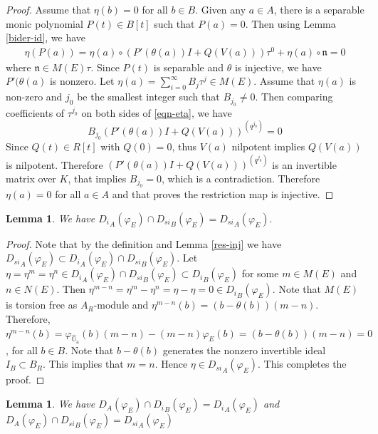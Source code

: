 \documentclass{amsart}
\newtheorem {lemma}[theorem] {\bf Lemma}
\numberwithin {equation}{section}
\def \hG{\hat{\mathbb{G}}_{\mathrm{a}}}
\begin{document}
\begin{proof} Assume that $\eta(b)=0$ for all $b\in B$. Given any $a\in A$, there is a separable monic polynomial $P(t)\in B[t]$ such that $P(a)=0$. Then using Lemma \ref{bider-id}, we have
\begin{align}\label{eqn-eta}
\eta(P(a))= \eta(a)\circ(P'(\theta (a))I+Q(V(a)))\tau^{0}+\eta(a)\circ\mathfrak{n}=0
\end{align}
where $\mathfrak{n}\in M(E)\tau$. Since $P(t)$ is separable and $\theta$ is injective, we have $P'(\theta (a)$ is nonzero. Let $\eta(a)=\displaystyle{\sum_{i=0}^{\infty}}B_{j}\tau^{j}\in M(E)$. Assume that $\eta(a)$ is non-zero and $j_{0}$ be the smallest integer such that $B_{j_{0}}\neq 0$.
Then comparing coefficients of $\tau^{j_{0}}$ on both sides of \eqref{eqn-eta}, we have
$$ B_{j_{0}}(P'(\theta (a))I+Q(V(a)))^{(q^{j_{0}})}=0$$
Since $Q(t)\in R[t]$ with $Q(0)=0$, thus $V(a)$ nilpotent implies $Q(V(a))$ is nilpotent. Therefore $(P'(\theta (a))I+Q(V(a)))^{(q^{j_{0}})}$ is an invertible matrix over $K$, that implies $B_{j_{0}}=0$, which is a contradiction. Therefore $\eta(a)=0$ for all $a\in A$ and that proves the restriction map is injective. 
\end{proof}

\begin{lemma}\label{inject} We have ${D_{i}}_{A}(\varphi_{E})\cap {D_{si}}_{B}(\varphi_{E})={D_{si}}_{A}(\varphi_{E}).$
\end{lemma}

\begin{proof} Note that by the definition and Lemma \ref{res-inj} we have ${D_{si}}_{A}(\varphi_{E})\subset {D_{i}}_{A}(\varphi_{E})\cap {D_{si}}_{B}(\varphi_{E})$. Let $\eta=\eta^{m}=\eta^{n}\in {D_{i}}_{A}(\varphi_{E})\cap {D_{si}}_{B}(\varphi_{E})\subset {D_{i}}_{B}(\varphi_{E})$ for some $m\in M(E)$ and $n\in N(E)$. Then $\eta^{m-n}=\eta^{m}-\eta^{n}=\eta-\eta=0 \in {D_{i}}_{B}(\varphi_{E})$. Note that $M(E)$ is torsion free as $A_{R}$-module and $\eta^{m-n}(b)=(b-\theta(b))(m-n)$. Therefore, $\eta^{m-n}(b)=\varphi_{\hG}(b)(m-n)-(m-n)\varphi_{E}(b)=(b-\theta(b))(m-n)=0$, for all $b\in B$. Note that $b-\theta(b)$ generates the nonzero invertible ideal $I_{B}\subset B_{R}$. This implies that $m=n$. Hence $\eta\in {D_{si}}_{A}(\varphi_{E})$. This completes the proof. 

\end{proof}

\begin{lemma}\label{inject-inn} We have ${D}_{A}(\varphi_{E})\cap {D_{i}}_{B}(\varphi_{E})={D_{i}}_{A}(\varphi_{E})$ and ${D}_{A}(\varphi_{E})\cap {D_{si}}_{B}(\varphi_{E})={D_{si}}_{A}(\varphi_{E})$
\end{lemma}
\end{document}
